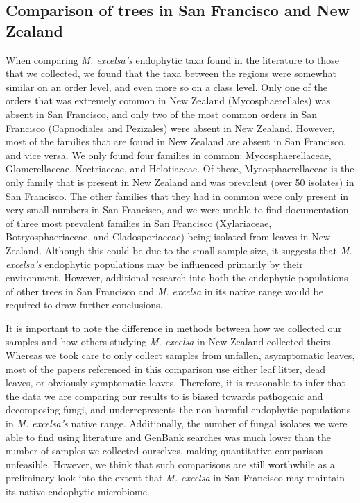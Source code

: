 \documentclass[fleqn,10pt,lineno]{wlpeerj} %
\begin{document}
\hypertarget{comparison-of-trees-in-san-francisco-and-new-zealand}{%
\subsection*{Comparison of trees in San Francisco and New Zealand}\label{comparison-of-trees-in-san-francisco-and-new-zealand}}

When comparing \emph{M. excelsa's} endophytic taxa found in the literature to those that we collected, we found that the taxa between the regions were somewhat similar on an order level, and even more so on a class level. Only one of the orders that was extremely common in New Zealand (Mycosphaerellales) was absent in San Francisco, and only two of the most common orders in San Francisco (Capnodiales and Pezizales) were absent in New Zealand. However, most of the families that are found in New Zealand are absent in San Francisco, and vice versa. We only found four families in common: Mycosphaerellaceae, Glomerellaceae, Nectriaceae, and Helotiaceae. Of these, Mycosphaerellaceae is the only family that is present in New Zealand and was prevalent (over 50 isolates) in San Francisco. The other families that they had in common were only present in very small numbers in San Francisco, and we were unable to find documentation of three most prevalent families in San Francisco (Xylariaceae, Botryosphaeriaceae, and Cladosporiaceae) being isolated from leaves in New Zealand. Although this could be due to the small sample size, it suggests that \emph{M. excelsa's} endophytic populations may be influenced primarily by their environment. However, additional research into both the endophytic populations of other trees in San Francisco and \emph{M. excelsa} in its native range would be required to draw further conclusions.

It is important to note the difference in methods between how we collected our samples and how others studying \emph{M. excelsa} in New Zealand collected theirs. Whereas we took care to only collect samples from unfallen, asymptomatic leaves, most of the papers referenced in this comparison use either leaf litter, dead leaves, or obviously symptomatic leaves. Therefore, it is reasonable to infer that the data we are comparing our results to is biased towards pathogenic and decomposing fungi, and underrepresents the non-harmful endophytic populations in \emph{M. excelsa's} native range. Additionally, the number of fungal isolates we were able to find using literature and GenBank searches was much lower than the number of samples we collected ourselves, making quantitative comparison unfeasible. However, we think that such comparisons are still worthwhile as a preliminary look into the extent that \emph{M. excelsa} in San Francisco may maintain its native endophytic microbiome.
\end{document}

